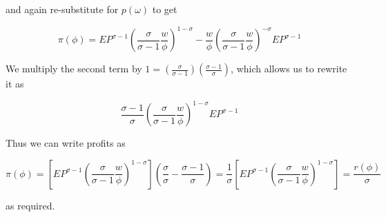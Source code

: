 \documentclass[12pt, letterpaper]{article}
\begin{document}
	and again re-substitute for \(p(\omega)\) to get 

	\[ \pi(\phi) = EP^{\sigma - 1} \left( \frac{\sigma}{\sigma - 1} \frac{w}{\phi} \right)^{1 - \sigma} - \frac{w}{\phi} \left( \frac{\sigma}{\sigma - 1} \frac{w}{\phi} \right)^{-\sigma} E P^{\sigma - 1}     \]

	We multiply the second term by \( 1 = \left(\frac{\sigma} {\sigma - 1}\right) \left(\frac{\sigma - 1} {\sigma}\right)\), which allows us to rewrite it as

	\[ \frac{\sigma - 1}{\sigma} \left( \frac{\sigma}{\sigma - 1} \frac{w}{\phi} \right)^{1-\sigma} E P^{\sigma - 1}   \]

	Thus we can write profits as 

	\[ \pi(\phi) = \left[EP^{\sigma - 1} \left( \frac{\sigma}{\sigma - 1} \frac{w}{\phi} \right)^{1 - \sigma}\right] \left( \frac{\sigma}{\sigma} - \frac{\sigma - 1}{\sigma} \right) = \frac{1}{\sigma} \left[EP^{\sigma - 1} \left( \frac{\sigma}{\sigma - 1} \frac{w}{\phi} \right)^{1 - \sigma}\right] = \frac{r(\phi)}{\sigma}    \]

	as required.
	
\end{document}
